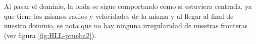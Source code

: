 \documentclass[12pt,a4paper]{book}
\begin{document}
Al pasar el dominio, la onda se sigue comportando como si estuviera centrada, ya que tiene los mismos radios y velocidades de la misma y al llegar al final de nuestro dominio, se nota que no hay ninguna irregularidad de nuestras fronteras (ver figura \ref{fig:HLL-prueba2}).


\begin{figure}[H]
\centering
{}

\end{figure}
\end{document}
